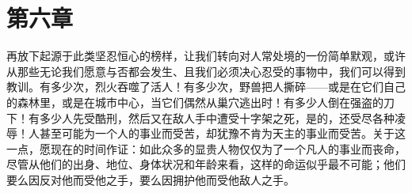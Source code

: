 
\section{第六章}

再放下起源于此类坚忍恒心的榜样，让我们转向对人常处境的一份简单默观，或许从那些无论我们愿意与否都会发生、且我们必须决心忍受的事物中，我们可以得到教训。有多少次，烈火吞噬了活人！有多少次，野兽把人撕碎——或是在它们自己的森林里，或是在城市中心，当它们偶然从巢穴逃出时！有多少人倒在强盗的刀下！有多少人先受酷刑，然后又在敌人手中遭受十字架之死，是的，还受尽各种凌辱！人甚至可能为一个人的事业而受苦，却犹豫不肯为天主的事业而受苦。关于这一点，愿现在的时间作证：如此众多的显贵人物仅仅为了一个凡人的事业而丧命，尽管从他们的出身、地位、身体状况和年龄来看，这样的命运似乎最不可能；他们要么因反对他而受他之手，要么因拥护他而受他敌人之手。\par

